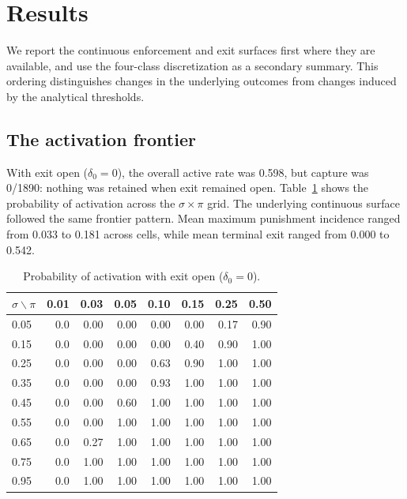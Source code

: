\section{Results}

We report the continuous enforcement and exit surfaces first where they are available, and use the four-class discretization as a secondary summary. This ordering distinguishes changes in the underlying outcomes from changes induced by the analytical thresholds.

\subsection{The activation frontier}

With exit open ($\delta_0=0$), the overall active rate was 0.598, but capture was 0/1890: nothing was retained when exit remained open. Table~\ref{tab:activation-frontier} shows the probability of activation across the $\sigma\times\pi$ grid. The underlying continuous surface followed the same frontier pattern. Mean maximum punishment incidence ranged from 0.033 to 0.181 across cells, while mean terminal exit ranged from 0.000 to 0.542.

\begin{table}[htbp]
\centering
\caption{Probability of activation with exit open ($\delta_0=0$).}
\label{tab:activation-frontier}
\begin{tabular}{lrrrrrrr}
\hline
$\sigma\backslash\pi$ & 0.01 & 0.03 & 0.05 & 0.10 & 0.15 & 0.25 & 0.50 \\
\hline
0.05 & 0.0 & 0.00 & 0.00 & 0.00 & 0.00 & 0.17 & 0.90 \\
0.15 & 0.0 & 0.00 & 0.00 & 0.00 & 0.40 & 0.90 & 1.00 \\
0.25 & 0.0 & 0.00 & 0.00 & 0.63 & 0.90 & 1.00 & 1.00 \\
0.35 & 0.0 & 0.00 & 0.00 & 0.93 & 1.00 & 1.00 & 1.00 \\
0.45 & 0.0 & 0.00 & 0.60 & 1.00 & 1.00 & 1.00 & 1.00 \\
0.55 & 0.0 & 0.00 & 1.00 & 1.00 & 1.00 & 1.00 & 1.00 \\
0.65 & 0.0 & 0.27 & 1.00 & 1.00 & 1.00 & 1.00 & 1.00 \\
0.75 & 0.0 & 1.00 & 1.00 & 1.00 & 1.00 & 1.00 & 1.00 \\
0.95 & 0.0 & 1.00 & 1.00 & 1.00 & 1.00 & 1.00 & 1.00 \\
\hline
\end{tabular}
\end{table}

